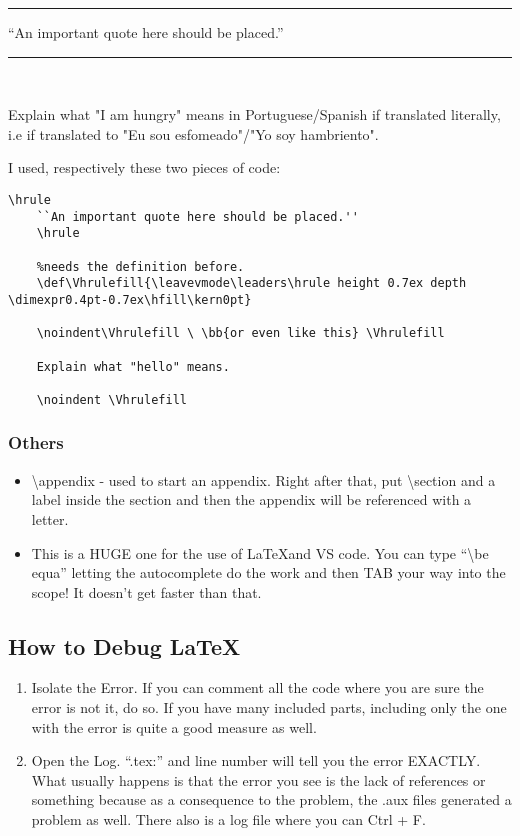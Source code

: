 \hrule
``An important quote here should be placed.''
\hrule
\vspace{1cm}
\noindent\Vhrulefill \  \Vhrulefill

Explain what "I am hungry" means in Portuguese/Spanish if translated literally, i.e if translated to "Eu sou esfomeado"/"Yo soy hambriento".

\noindent \Vhrulefill
\vspace{.5cm}

I used, respectively these two pieces of code:
\begin{lstlisting}[language = Tex]
    \hrule
    ``An important quote here should be placed.''
    \hrule

    %needs the definition before.
    \def\Vhrulefill{\leavevmode\leaders\hrule height 0.7ex depth \dimexpr0.4pt-0.7ex\hfill\kern0pt}

    \noindent\Vhrulefill \ \bb{or even like this} \Vhrulefill

    Explain what "hello" means.

    \noindent \Vhrulefill

\end{lstlisting}



\subsubsection{Others}
\begin{itemize}
    \item \textbackslash appendix - used to start an appendix. Right after that, put \textbackslash section and a label inside the section and then the appendix will be referenced with a letter.
    \item This is a HUGE one for the use of \LaTeX and VS code. You can type ``\textbackslash be equa'' letting the autocomplete do the work and then TAB your way into the scope! It doesn't get faster than that.
\end{itemize}

\subsection{How to Debug LaTeX}
\begin{enumerate}
    \item Isolate the Error. If you can comment all the code where you are sure the error is not it, do so. If you have many included parts, including only the one with the error is quite a good measure as well.
    \item Open the Log. ``.tex:'' and line number will tell you the error EXACTLY. What usually happens is that the error you see is the lack of references or something because as a consequence to the problem, the .aux files generated a problem as well.  There also is a log file where you can Ctrl + F.
\end{enumerate}